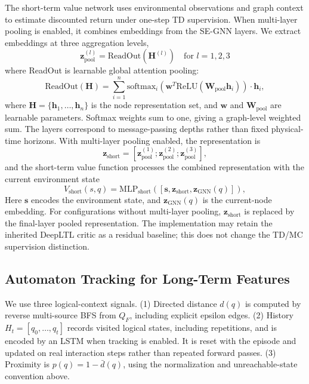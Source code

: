 \documentclass[journal]{IEEEtran}
\begin{document}
The short-term value network uses environmental observations and graph context to estimate discounted return under one-step TD supervision. When multi-layer pooling is enabled, it combines embeddings from the SE-GNN layers.
We extract embeddings at three aggregation levels,
\begin{equation}
\mathbf{z}^{(l)}_{\text{pool}} = \text{ReadOut}(\mathbf{H}^{(l)}) \quad \text{for } l = 1, 2, 3
\label{eq:multiscale_readout}
\end{equation}
where ReadOut is learnable global attention pooling:
\begin{equation}
\label{eq:readout}
	\text{ReadOut}(\mathbf{H}) = \sum_{i=1}^{n} \text{softmax}_i(\mathbf{w}^T \text{ReLU}(\mathbf{W}_{\text{pool}} \mathbf{h}_i)) \cdot \mathbf{h}_i,
\end{equation}
where $\mathbf H=\{\mathbf h_1,\ldots,\mathbf h_n\}$ is the node representation set, and $\mathbf w$ and $\mathbf W_{\mathrm{pool}}$ are learnable parameters. Softmax weights sum to one, giving a graph-level weighted sum. The layers correspond to message-passing depths rather than fixed physical-time horizons. With multi-layer pooling enabled, the representation is
\begin{equation}
\mathbf{z}_{\text{short}} = [\mathbf{z}_{\text{pool}}^{(1)}; \mathbf{z}_{\text{pool}}^{(2)}; \mathbf{z}_{\text{pool}}^{(3)}],
\end{equation}
and the short-term value function processes the combined representation with the current environment state
\begin{equation}
V_{\text{short}}(s, q) = \text{MLP}_{\text{short}}([\mathbf{s}, \mathbf{z}_{\text{short}}, \mathbf{z}_{\text{GNN}}(q)]),
\label{eq:short_value_comp}
\end{equation}
Here $\mathbf s$ encodes the environment state, and $\mathbf z_{\mathrm{GNN}}(q)$ is the current-node embedding. For configurations without multi-layer pooling, $\mathbf z_{\mathrm{short}}$ is replaced by the final-layer pooled representation. The implementation may retain the inherited DeepLTL critic as a residual baseline; this does not change the TD/MC supervision distinction.

\subsection{Automaton Tracking for Long-Term Features}

We use three logical-context signals. (1) Directed distance $d(q)$ is computed by reverse multi-source BFS from $Q_F$, including explicit epsilon edges. (2) History $H_t=[q_0,\ldots,q_t]$ records visited logical states, including repetitions, and is encoded by an LSTM when tracking is enabled. It is reset with the episode and updated on real interaction steps rather than repeated forward passes. (3) Proximity is $p(q)=1-\bar d(q)$, using the normalization and unreachable-state convention above.
\end{document}
